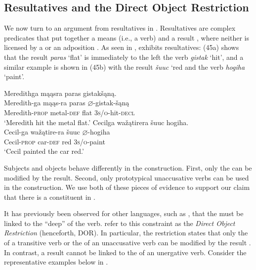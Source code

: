 \documentclass[output=paper]{LSP/langsci}
\begin{document}
\subsection{Resultatives and the Direct Object Restriction}

We now turn to an argument from resultatives in . Resultatives are complex predicates that put together a means  (i.e., a verb) and a result , where neither is licensed by a  or an adposition \citep[507]{Williams2008}. As seen in ,  exhibits resultatives: (45a) shows that the result \textit{paras} `flat' is immediately to the left the verb \textit{gistak} `hit', and a similar example is shown in (45b) with the result \textit{\v{s}uuc} `red and the verb \textit{hogiha} `paint'.

\begin{exe}
\ex\label{ex:jrs:45}
\begin{xlist}
\ex 
\glll Meredithga	mąąsra		paras	gistak\v{s}ąną.\\
Meredith-ga			mąąs-ra	paras	$\varnothing$-gistak-\v{s}ąną \\
	Meredith-\textsc{prop}		metal-\textsc{def}		flat	 \textsc{3s/o}-hit-\textsc{decl} \\
\trans `Meredith hit the metal flat.'
\ex 
\glll Cecilga	wa\v{z}ątirera	 \v{s}uuc	hogiha.\\
Cecil-ga	wa\v{z}ątire-ra \v{s}uuc	$\varnothing$-hogiha \\
	Cecil-\textsc{prop}	car-\textsc{def}	red		\textsc{3s/o}-paint \\
\trans `Cecil painted the car red.'
\end{xlist}
\end{exe}

Subjects and objects behave differently in the  construction. First, only the  can be modified by the result. Second, only prototypical unaccusative verbs can be used in the  construction. We use both of these pieces of evidence to support our claim that there is a  constituent in .

It has previously been observed for other languages, such as , that the   must be linked to the ``deep''  of the verb.  \citet{LevinRappaportHovav1995} refer to this constraint as the \textit{Direct Object Restriction} (henceforth, DOR). In particular, the restriction states that only the  of a transitive verb or the  of an unaccusative verb can be modified by the result . In contrast, a result  cannot be linked to the  of an unergative verb. Consider the representative  examples below in .
\end{document}
